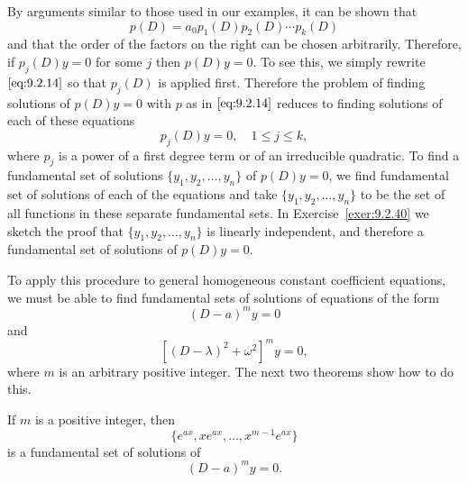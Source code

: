 \documentclass{ximera}
\begin{document}
By arguments similar to those used in our examples, it can be shown
that
\begin{equation} \label{eq:9.2.14}
p(D)=a_0p_1(D)p_2(D)\cdots p_k(D)
\end{equation}
and that the order of the factors on the right can be chosen
arbitrarily. Therefore, if $p_j(D)y=0$ for some $j$ then
$p(D)y=0$. To see this, we simply rewrite $\eqref{eq:9.2.14}$ so that
$p_j(D)$ is applied first. Therefore the problem of finding solutions
of $p(D)y=0$ with $p$ as in $\eqref{eq:9.2.14}$ reduces to finding solutions of each of these equations
$$
p_j(D)y=0,\quad 1\leq j\leq k,
$$
where $p_j$ is a power of a first degree term or of an irreducible
quadratic. To find a fundamental set of solutions
$\{y_1,y_2,\dots,y_n\}$ of $p(D)y=0$, we find fundamental set of solutions of each of the equations and take $\{y_1,y_2,\dots,y_n\}$ to
be the set of all functions in these separate fundamental sets. In Exercise~\ref{exer:9.2.40} we sketch the proof that
$\{y_1,y_2,\dots,y_n\}$ is linearly independent, and therefore a
fundamental set of solutions of $p(D)y=0$.

To apply this procedure to general homogeneous constant coefficient
equations, we must be able to find fundamental sets of solutions of
equations of the form
$$
(D-a)^my=0
$$
and
$$
\left[(D-\lambda)^2+\omega^2\right]^my=0,
$$
where $m$ is an arbitrary positive integer. The next two theorems show
how to do this.

\begin{theorem}\label{thmtype:9.2.1}
If $m$ is a positive integer, then
\begin{equation} \label{eq:9.2.15}
\{e^{ax}, xe^{ax},\dots, x^{m-1}e^{ax}\}
\end{equation}
is a fundamental set of solutions of
\begin{equation} \label{eq:9.2.16}
(D-a)^my=0.
\end{equation}
\end{theorem}
\end{document}

